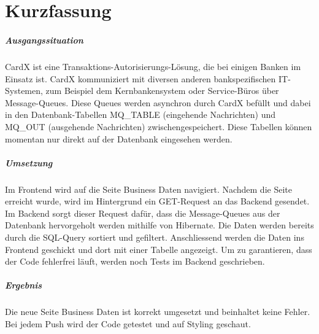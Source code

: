 \chapter{Kurzfassung}\label{ch:kurzfassung}

\paragraph{Ausgangssituation} 
\gls{CardX} ist eine Transaktions-Autorisierungs-Lösung, die bei einigen Banken im Einsatz ist. CardX kommuniziert mit diversen anderen bankspezifischen IT-Systemen, zum Beispiel dem Kernbankensystem oder Service-Büros über Message-Queues.
Diese Queues werden asynchron durch CardX befüllt und dabei in den Datenbank-Tabellen MQ\_TABLE (eingehende Nachrichten) und MQ\_OUT (ausgehende Nachrichten) zwischengespeichert. Diese Tabellen können momentan nur direkt auf der Datenbank eingesehen werden.

\paragraph{Umsetzung} 
Im Frontend wird auf die Seite Business Daten navigiert. Nachdem die Seite erreicht wurde, wird im Hintergrund ein GET-Request an das Backend gesendet. Im Backend sorgt dieser Request dafür, dass die Message-Queues aus der Datenbank hervorgeholt werden mithilfe von Hibernate. Die Daten werden bereits durch die SQL-Query sortiert und gefiltert. Anschliessend werden die Daten ins Frontend geschickt und dort mit einer Tabelle angezeigt. Um zu garantieren, dass der Code fehlerfrei läuft, werden noch Tests im Backend geschrieben.

\paragraph{Ergebnis}
Die neue Seite Business Daten ist korrekt umgesetzt und beinhaltet keine Fehler. Bei jedem Push wird der Code getestet und auf Styling geschaut. 

\newpage
